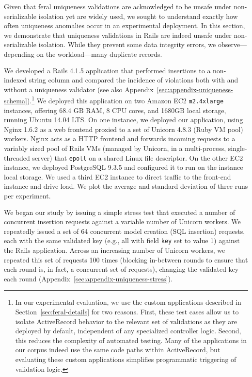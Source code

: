 Given that feral uniqueness validations are acknowledged to be unsafe
under non-serializable isolation yet are widely used, we sought to
understand exactly how often uniqueness anomalies occur in an
experimental deployment. In this section, we demonstrate that
uniqueness validations in Rails are indeed unsafe under
non-serializable isolation. While they prevent some data integrity
errors, we observe---depending on the workload---many duplicate
records.

 We developed a Rails 4.1.5 application
that performed insertions to a non-indexed string column and compared
the incidence of violations both with and without a uniqueness
validator (see also
Appendix~\ref{sec:appendix-uniqueness-schema}).\footnote{In our
  experimental evaluation, we use the custom applications described
  in Section~\ref{sec:feral-details} for two
  reasons. First, these test cases allow us to isolate ActiveRecord
  behavior to the relevant set of validations as they are deployed by
  default, independent of any specialized controller logic. Second,
  this reduces the complexity of automated testing. Many of the
  applications in our corpus indeed use the same code paths within
  ActiveRecord, but evaluating these custom applications simplifies
  programmatic triggering of validation logic.} We deployed this
application on two Amazon EC2 \texttt{m2.4xlarge} instances, offering
68.4 GB RAM, 8 CPU cores, and 1680GB local storage, running Ubuntu
14.04 LTS. On one instance, we deployed our application, using Nginx
1.6.2 as a web frontend proxied to a set of Unicorn 4.8.3 (Ruby VM
pool) workers. Nginx acts as a HTTP frontend and forwards incoming
requests to a variably sized pool of Rails VMs (managed by Unicorn, in
a multi-process, single-threaded server) that \texttt{epoll} on a
shared Linux file descriptor. On the other EC2 instance, we deployed
PostgreSQL 9.3.5 and configured it to run on the instance local
storage. We used a third EC2 instance to direct traffic to the
front-end instance and drive load. We plot the average and standard
deviation of three runs per experiment.

 We began our study by issuing a simple stress
test that executed a number of concurrent insertion requests against a
variable number of Unicorn workers. We repeatedly issued a set of 64
concurrent model creation (SQL insertion) requests, each with the same
validated key (e.g., all with field \texttt{key} set to value 1)
against the Rails application. Across an increasing number of Unicorn
workers, we repeated this set of requests 100 times (blocking
in-between rounds to ensure that each round is, in fact, a concurrent
set of requests), changing the validated key each round
(Appendix~\ref{sec:appendix-uniqueness-stress}).

